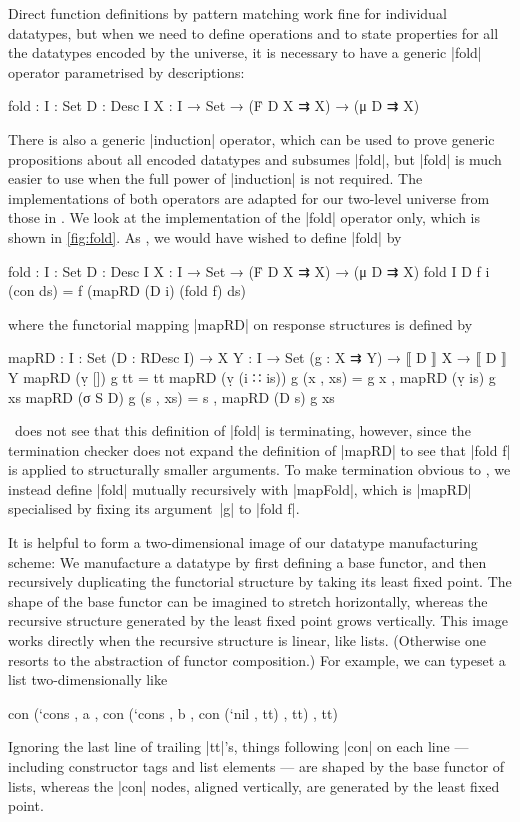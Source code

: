 Direct function definitions by pattern matching work fine for individual datatypes, but when we need to define operations and to state properties for all the datatypes encoded by the universe, it is necessary to have a generic |fold| operator parametrised by descriptions:
\begin{code}
fold : {I : Set} {D : Desc I} {X : I → Set} → (Ḟ D X ⇉ X) → (μ D ⇉ X)
\end{code}
There is also a generic |induction| operator, which can be used to prove generic propositions about all encoded datatypes and subsumes |fold|, but |fold| is much easier to use when the full power of |induction| is not required.
The implementations of both operators are adapted for our two-level universe from those in .
We look at the implementation of the |fold| operator only, which is shown in \autoref{fig:fold}.
As \citeauthor{McBride-ornaments}, we would have wished to define |fold| by
\begin{code}
fold : {I : Set} {D : Desc I} {X : I → Set} → (Ḟ D X ⇉ X) → (μ D ⇉ X)
fold {I} {D} f {i} (con ds) = f (mapRD (D i) (fold f) ds)
\end{code}
where the functorial mapping |mapRD| on response structures is defined by
\begin{code}
mapRD :  {I : Set} (D : RDesc I) →
         {X Y : I → Set} (g : X ⇉ Y) → ⟦ D ⟧ X → ⟦ D ⟧ Y
mapRD (ṿ [])        g tt        = tt
mapRD (ṿ (i ∷ is))  g (x , xs)  = g x , mapRD (ṿ is) g xs
mapRD (σ S D)       g (s , xs)  = s , mapRD (D s) g xs
\end{code}
\Agda\ does not see that this definition of |fold| is terminating, however, since the termination checker does not expand the definition of |mapRD| to see that |fold f| is applied to structurally smaller arguments.
To make termination obvious to \Agda, we instead define |fold| mutually recursively with |mapFold|, which is |mapRD| specialised by fixing its argument~|g| to |fold f|.

It is helpful to form a two-dimensional image of our datatype manufacturing scheme:
We manufacture a datatype by first defining a base functor, and then recursively duplicating the functorial structure by taking its least fixed point.
The shape of the base functor can be imagined to stretch horizontally, whereas the recursive structure generated by the least fixed point grows vertically.
This image works directly when the recursive structure is linear, like lists.
(Otherwise one resorts to the abstraction of functor composition.)
For example, we can typeset a list two-dimensionally like
\begin{code}
con (`cons  , a  ,
con (`cons  , b  ,
con (`nil   ,
      tt) , tt) , tt)
\end{code}
Ignoring the last line of trailing |tt|'s, things following |con| on each line --- including constructor tags and list elements --- are shaped by the base functor of lists, whereas the |con| nodes, aligned vertically, are generated by the least fixed point.

